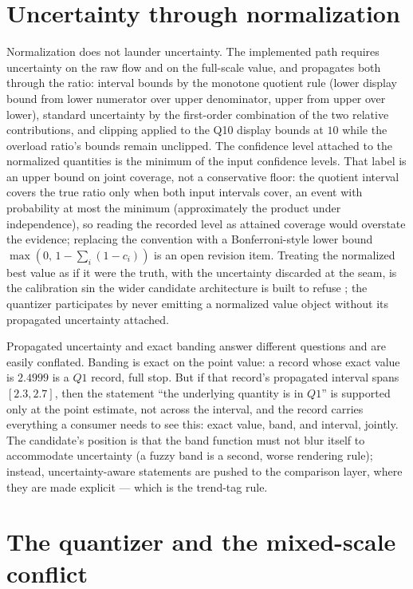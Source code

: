 \section{Uncertainty through normalization}\label{ch08:sec:uncertainty}

Normalization does not launder uncertainty. The implemented path requires
uncertainty on the raw flow and on the full-scale value, and propagates
both through the ratio: interval bounds by the monotone quotient rule
(lower display bound from lower numerator over upper denominator, upper
from upper over lower), standard uncertainty by the first-order
combination of the two relative contributions, and clipping applied to the
Q10 display bounds at $10$ while the overload ratio's bounds remain
unclipped. The confidence level attached to the normalized quantities is
the minimum of the input confidence levels. That label is an upper bound
on joint coverage, not a conservative floor: the quotient interval covers
the true ratio only when both input intervals cover, an event with
probability at most the minimum (approximately the product under
independence), so reading the recorded level as attained coverage would
overstate the evidence; replacing the convention with a Bonferroni-style
lower bound $\max(0,\,1-\sum_i(1-c_i))$ is an open revision item.
Treating the normalized best value as if it were the truth,
with the uncertainty discarded at the seam, is the calibration sin the
wider candidate architecture is built to refuse \cite{kennedyohagan}; the
quantizer participates by never emitting a normalized value object without
its propagated uncertainty attached.

Propagated uncertainty and exact banding answer different
questions and are easily conflated. Banding is exact on the point value:
a record whose exact value is $2.4999$ is a $Q1$ record, full stop. But if
that record's propagated interval spans $[2.3, 2.7]$, then the statement
``the underlying quantity is in $Q1$'' is supported only at the point
estimate, not across the interval, and the record carries everything a
consumer needs to see this: exact value, band, and interval, jointly. The
candidate's position is that the band function must not blur itself to
accommodate uncertainty (a fuzzy band is a second, worse rendering rule);
instead, uncertainty-aware statements are pushed to the comparison layer,
where they are made explicit --- which is the trend-tag rule.

\section{The quantizer and the mixed-scale conflict}\label{ch08:sec:mixedscale}

